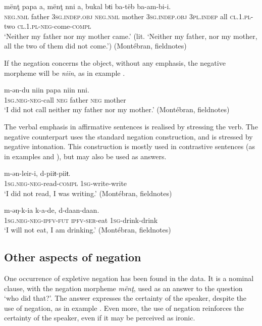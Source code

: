 \documentclass[output=paper,colorlinks,citecolor=brown]{langscibook}
\begin{document}
\ea\label{ex:mank:67}
    \gll mënţ papa a, mënţ nni a, bukal bŧi ba-tëb ba-am-bi-i.\\
         \textsc{neg.nml} father \textsc{3sg.indep.obj} \textsc{neg.nml} mother \textsc{3sg.indep.obj} \textsc{3pl.indep} all \textsc{cl.1.pl}-two \textsc{cl.1.pl-neg}-come-\textsc{compl}\\ 
         
    \glt ‘Neither my father nor my mother came.’ (lit. ‘Neither my father, nor my mother, all the two of them did not come.’) (Montébran, fieldnotes)
\z

If the negation concerns the object, without any emphasis, the negative morpheme will be \textit{niin}, as in example .

\ea\label{ex:mank:68}
    \gll m-ən-du niin papa niin nni.\\
         \textsc{1sg.neg-neg}-call \textsc{neg} father \textsc{neg} mother\\
    \glt ‘I did not call neither my father nor my mother.’ (Montébran, fieldnotes)
\z

The verbal emphasis in affirmative sentences is realised by stressing the verb. The negative counterpart uses the standard negation construction, and is stressed by negative intonation. This construction is mostly used in contrastive sentences (as in examples  and ), but may also be used as answers.

\ea\label{ex:mank:69}
    \gll m-ən-leir-i, d-piiŧ-piiŧ. \\
         \textsc{1sg.neg-neg}-read-\textsc{compl} \textsc{1sg}-write-write\\
    \glt ‘I did not read, I was writing.’ (Montébran, fieldnotes)
\z

\ea\label{ex:mank:70}
    \gll m-əŋ-k-ia k-a-de, d-daan-daan.\\
         \textsc{1sg.neg-neg-ipfv-fut} \textsc{ipfv-ser}-eat \textsc{1sg}-drink-drink\\
    \glt ‘I will not eat, I am drinking.’ (Montébran, fieldnotes)
\z

\subsection{Other aspects of negation}\label{sec:mank:4.6}

One occurrence of expletive negation has been found in the data. It is a nominal clause, with the negation morpheme \textit{mënţ}, used as an answer to the question ‘who did that?’. The answer expresses the certainty of the speaker, despite the use of negation, as in example . Even more, the use of negation reinforces the certainty of the speaker, even if it may be perceived as ironic.
\end{document}
